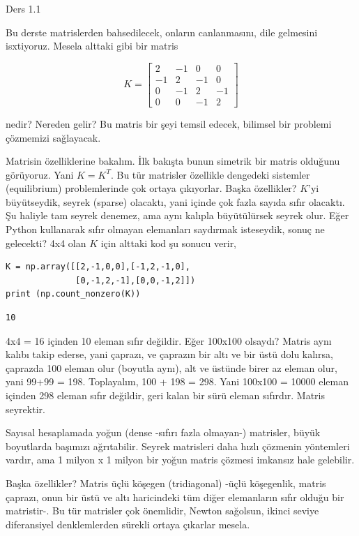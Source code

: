 \documentclass[12pt,fleqn]{article}\usepackage{../../common}
\begin{document}
Ders 1.1

Bu derste matrislerden bahsedilecek, onların canlanmasını, dile gelmesini
isxtiyoruz. Mesela alttaki gibi bir matris

$$ 
K =
\left[\begin{array}{rrrr}
2 & -1 & 0 & 0\\
-1 & 2 & -1 & 0\\
0 & -1 & 2 & -1\\
0 & 0 & -1 & 2
\end{array}\right]
 $$

nedir? Nereden gelir? Bu matris bir şeyi temsil edecek, bilimsel bir
problemi çözmemizi sağlayacak. 

Matrisin özelliklerine bakalım. İlk bakışta bunun simetrik bir matris
olduğunu görüyoruz. Yani $K = K^T$. Bu tür matrisler özellikle dengedeki
sistemler (equilibrium) problemlerinde çok ortaya çıkıyorlar. Başka
özellikler? $K$'yi büyütseydik, seyrek (sparse) olacaktı, yani içinde çok
fazla sayıda sıfır olacaktı. Şu haliyle tam seyrek denemez, ama aynı
kalıpla büyütülürsek seyrek olur. Eğer Python kullanarak sıfır olmayan
elemanları saydırmak isteseydik, sonuç ne gelecekti? 4x4 olan $K$ için
alttaki kod şu sonucu verir,

\begin{verbatim}
K = np.array([[2,-1,0,0],[-1,2,-1,0],
              [0,-1,2,-1],[0,0,-1,2]])
print (np.count_nonzero(K))
\end{verbatim}

\begin{verbatim}
10
\end{verbatim}

4x4 = 16 içinden 10 eleman sıfır değildir. Eğer 100x100 olsaydı? Matris
aynı kalıbı takip ederse, yani çaprazı, ve çaprazın bir altı ve bir üstü
dolu kalırsa, çaprazda 100 eleman olur (boyutla aynı), alt ve üstünde birer
az eleman olur, yani 99+99 = 198. Toplayalım, 100 + 198 = 298. Yani 100x100
= 10000 eleman içinden 298 eleman sıfır değildir, geri kalan bir sürü
eleman sıfırdır. Matris seyrektir.

Sayısal hesaplamada yoğun (dense -sıfırı fazla olmayan-) matrisler, büyük
boyutlarda başımızı ağrıtabilir. Seyrek matrisleri daha hızlı çözmenin
yöntemleri vardır, ama 1 milyon x 1 milyon bir yoğun matris çözmesi imkansız
hale gelebilir.

Başka özellikler? Matris üçlü köşegen (tridiagonal) -üçlü köşegenlik, matris
çaprazı, onun bir üstü ve altı haricindeki tüm diğer elemanların sıfır olduğu
bir matristir-. Bu tür matrisler çok önemlidir, Newton sağolsun, ikinci seviye
diferansiyel denklemlerden sürekli ortaya çıkarlar mesela.
\end{document}
